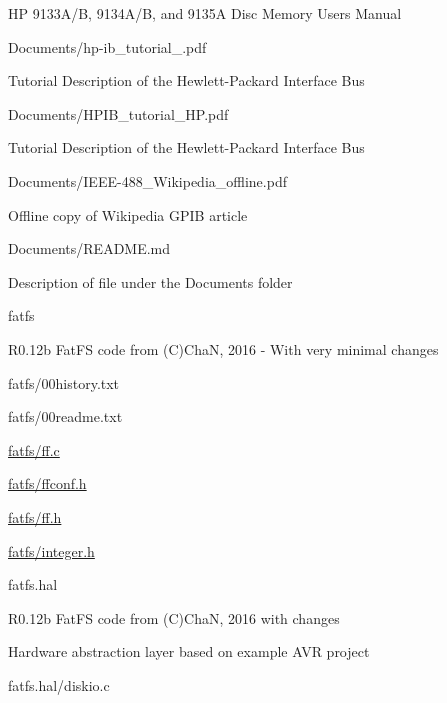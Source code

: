 {\begin{DoxyItemize}
\begin{DoxyItemize}
\item HP 9133\+A/B, 9134\+A/B, and 9135A Disc Memory Users Manual
\end{DoxyItemize}
\item Documents/hp-\/ib\+\_\+tutorial\+\_.\+pdf
\begin{DoxyItemize}
\item Tutorial Description of the Hewlett-\/\+Packard Interface Bus
\end{DoxyItemize}
\item Documents/\+H\+P\+I\+B\+\_\+tutorial\+\_\+\+H\+P.\+pdf
\begin{DoxyItemize}
\item Tutorial Description of the Hewlett-\/\+Packard Interface Bus
\end{DoxyItemize}
\item Documents/\+I\+E\+E\+E-\/488\+\_\+\+Wikipedia\+\_\+offline.\+pdf
\begin{DoxyItemize}
\item Offline copy of Wikipedia G\+P\+IB article
\end{DoxyItemize}
\item Documents/\+R\+E\+A\+D\+M\+E.\+md
\begin{DoxyItemize}
\item Description of file under the Documents folder
\end{DoxyItemize}
\item fatfs
\begin{DoxyItemize}
\item R0.\+12b Fat\+FS code from (C)ChaN, 2016 -\/ With very minimal changes
\item fatfs/00history.\+txt
\item fatfs/00readme.\+txt
\item \hyperlink{ff_8c}{fatfs/ff.\+c}
\item \hyperlink{ffconf_8h}{fatfs/ffconf.\+h}
\item \hyperlink{ff_8h}{fatfs/ff.\+h}
\item \hyperlink{integer_8h}{fatfs/integer.\+h}
\end{DoxyItemize}
\item fatfs.\+hal
\begin{DoxyItemize}
\item R0.\+12b Fat\+FS code from (C)ChaN, 2016 with changes
\item Hardware abstraction layer based on example A\+VR project
\item fatfs.\+hal/diskio.c

\end{DoxyItemize}
\end{DoxyItemize}}
